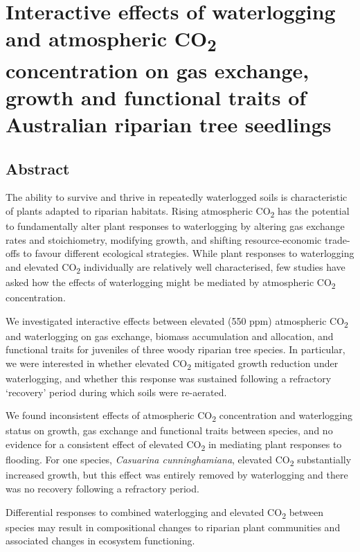 \documentclass[12pt,a4paper]{memoir}
\begin{document}
\doublespacing

\chapter[Interactive effects of waterlogging and atmospheric CO\textsubscript{2} concentration on gas exchange, growth and functional traits of Australian riparian tree seedlings][Waterlogging - eCO\textsubscript{2} interactions]{Interactive effects of waterlogging and atmospheric CO\textsubscript{2} concentration on gas exchange, growth and functional traits of Australian riparian tree seedlings}
\newpage

\section*{Abstract}
The ability to survive and thrive in repeatedly waterlogged soils is characteristic of plants adapted to riparian habitats. Rising atmospheric CO\textsubscript{2} has the potential to fundamentally alter plant responses to waterlogging by altering gas exchange rates and stoichiometry, modifying growth, and shifting resource-economic trade-offs to favour different ecological strategies. While plant responses to waterlogging and elevated CO\textsubscript{2} individually are relatively well characterised, few studies have asked how the effects of waterlogging might be mediated by atmospheric CO\textsubscript{2} concentration. 

We investigated interactive effects between elevated (550 ppm) atmospheric CO\textsubscript{2} and waterlogging on gas exchange, biomass accumulation and allocation, and functional traits for juveniles of three woody riparian tree species. In particular, we were interested in whether elevated CO\textsubscript{2} mitigated growth reduction under waterlogging, and whether this response was sustained following a refractory ‘recovery’ period during which soils were re-aerated. 

We found inconsistent effects of atmospheric CO\textsubscript{2} concentration and waterlogging status on growth, gas exchange and functional traits between species, and no evidence for a consistent effect of elevated CO\textsubscript{2} in mediating plant responses to flooding. For one species, \textit{Casuarina cunninghamiana}, elevated CO\textsubscript{2} substantially increased growth, but this effect was entirely removed by waterlogging and there was no recovery following a refractory period. 

Differential responses to combined waterlogging and elevated CO\textsubscript{2} between species may result in compositional changes to riparian plant communities and associated changes in ecosystem functioning.
\end{document}
